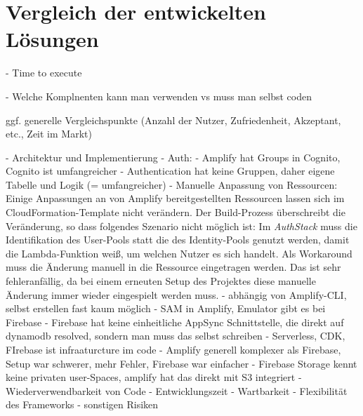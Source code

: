 \chapter{Vergleich der entwickelten Lösungen}

- Time to execute

- Welche Komplnenten kann man verwenden vs muss man selbst coden

ggf. generelle Vergleichspunkte (Anzahl der Nutzer, Zufriedenheit, Akzeptant, etc., Zeit im Markt)

- Architektur und Implementierung
  - Auth:
    - Amplify hat Groups in Cognito, Cognito ist umfangreicher
    - Authentication hat keine Gruppen, daher eigene Tabelle und Logik (= umfangreicher)
  - Manuelle Anpassung von Ressourcen: Einige Anpassungen an von Amplify bereitgestellten Ressourcen lassen sich im CloudFormation-Template nicht verändern. Der Build-Prozess überschreibt die Veränderung, so dass folgendes Szenario nicht möglich ist: Im \textit{AuthStack} muss die Identifikation des User-Pools statt die des Identity-Pools genutzt werden, damit die Lambda-Funktion weiß, um welchen Nutzer es sich handelt. Als Workaround muss die Änderung manuell in die Ressource eingetragen werden. Das ist sehr fehleranfällig, da bei einem erneuten Setup des Projektes diese manuelle Änderung immer wieder eingespielt werden muss.
    - abhängig von Amplify-CLI, selbst erstellen fast kaum möglich
 - SAM in Amplify, Emulator gibt es bei Firebase
 - Firebase hat keine einheitliche AppSync Schnittstelle, die direkt auf dynamodb resolved, sondern man muss das selbst schreiben
 - Serverless, CDK, FIrebase ist infraaturcture im code
 - Amplify generell komplexer als Firebase, Setup war schwerer, mehr Fehler, Firebase war einfacher
 - Firebase Storage kennt keine privaten user-Spaces, amplify hat das direkt mit S3 integriert
- Wiederverwendbarkeit von Code
- Entwicklungszeit
- Wartbarkeit
- Flexibilität des Frameworks
- sonstigen Risiken